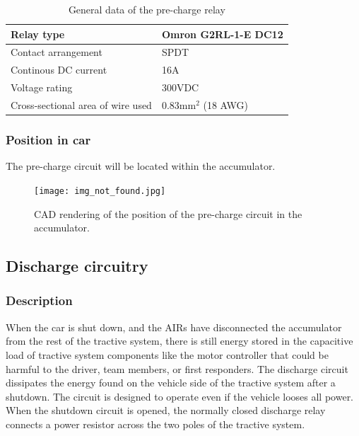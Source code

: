 \documentclass{article}
\begin{document}
	\begin{table}[H]
	    \centering
	    \begin{tabular}{|l|l|}
	    \hline
	    Relay type & Omron G2RL-1-E DC12 \\ \hline
	    Contact arrangement & SPDT \\ \hline
	    Continous DC current & 16A \\ \hline
	    Voltage rating & 300VDC \\ \hline
	    Cross-sectional area of wire used & 0.83mm$^2$ (18 AWG) \\ \hline
	    \end{tabular}
	    \caption{General data of the pre-charge relay}
	    \label{PCrelay}
	\end{table}

\subsubsection{Position in car}
The pre-charge circuit will be located within the accumulator. 

\begin{figure}[h]
    \centering
    \texttt{[image: img\_not\_found.jpg]}
    \caption{CAD rendering of the position of the pre-charge circuit in the accumulator.}
\end{figure}


\subsection{Discharge circuitry}\label{discharge_circuitry}
\subsubsection{Description}
When the car is shut down, and the AIRs have disconnected the accumulator from the rest of the tractive system, there is still energy stored in the capacitive load of tractive system components like the motor controller that could be harmful to the driver, team members, or first responders. The discharge circuit dissipates the energy found on the vehicle side of the tractive system after a shutdown. The circuit is designed to operate even if the vehicle looses all power. When the shutdown circuit is opened, the normally closed discharge relay connects a power resistor across the two poles of the tractive system.  
\end{document}
